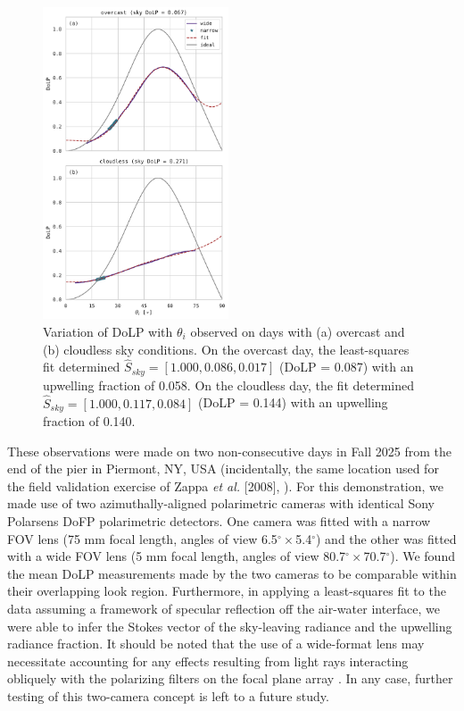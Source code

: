 \documentclass[letterpaper,journal]{IEEEtran}
\begin{document}
\begin{figure}[!hb]
    \centering
    \includegraphics[width=0.49\textwidth]{_figures/DoLP_AOI_field.pdf}
    \vspace{-25pt}
    \caption{Variation of DoLP with $\theta_i$ observed on days with (a) overcast and (b) cloudless sky conditions. On the overcast day, the least-squares fit determined $\hat{S}_{sky}=[1.000,0.086,0.017]$ (DoLP = 0.087) with an upwelling fraction of 0.058. On the cloudless day, the fit determined $\hat{S}_{sky}=[1.000,0.117,0.084]$ (DoLP = 0.144) with an upwelling fraction of 0.140.}
    \label{fig:DoLP_AOI_field}
\end{figure}

These observations were made on two non-consecutive days in Fall 2025 from the end of the pier in Piermont, NY, USA (incidentally, the same location used for the field validation exercise of Zappa \emph{et al.} [2008], \cite{Zappa2008}). For this demonstration, we made use of two azimuthally-aligned polarimetric cameras with identical Sony Polarsens DoFP polarimetric detectors. One camera was fitted with a narrow FOV lens (75 mm focal length, angles of view 6.5$^{\circ}\times$5.4$^{\circ}$) and the other was fitted with a wide FOV lens (5 mm focal length, angles of view 80.7$^{\circ}\times$70.7$^{\circ}$). We found the mean DoLP measurements made by the two cameras to be comparable within their overlapping look region. Furthermore, in applying a least-squares fit to the data assuming a framework of specular reflection off the air-water interface, we were able to infer the Stokes vector of the sky-leaving radiance and the upwelling radiance fraction. It should be noted that the use of a wide-format lens may necessitate accounting for any effects resulting from light rays interacting obliquely with the polarizing filters on the focal plane array \cite{pistellato_geometric_2024}. In any case, further testing of this two-camera concept is left to a future study.
\end{document}
